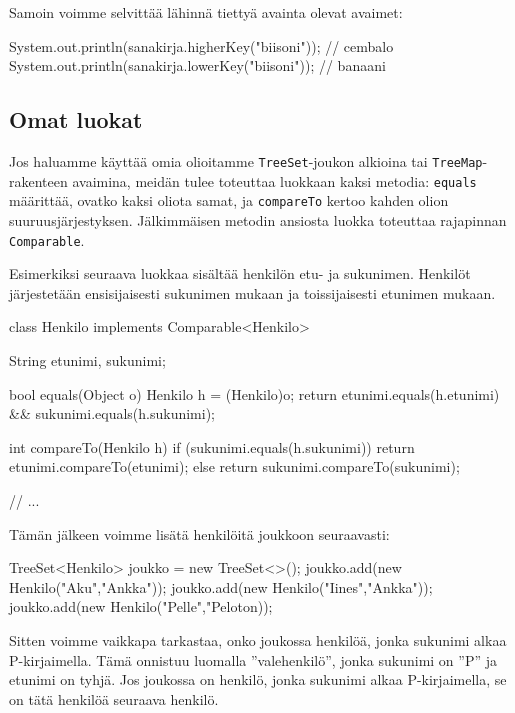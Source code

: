 Samoin voimme selvittää lähinnä tiettyä avainta olevat avaimet:

\begin{code}
System.out.println(sanakirja.higherKey("biisoni")); // cembalo
System.out.println(sanakirja.lowerKey("biisoni")); // banaani
\end{code}

\subsection{Omat luokat}

Jos haluamme käyttää omia olioitamme \texttt{TreeSet}-joukon alkioina
tai \texttt{TreeMap}-rakenteen avaimina, meidän tulee toteuttaa
luokkaan kaksi metodia:
\texttt{equals} määrittää, ovatko kaksi oliota samat,
ja \texttt{compareTo} kertoo kahden olion suuruusjärjestyksen.
Jälkimmäisen metodin ansiosta luokka toteuttaa rajapinnan
\texttt{Comparable}.

Esimerkiksi seuraava luokkaa sisältää henkilön etu- ja sukunimen.
Henkilöt järjestetään ensisijaisesti sukunimen mukaan ja
toissijaisesti etunimen mukaan.

\begin{code}
class Henkilo implements Comparable<Henkilo> {
    String etunimi, sukunimi;

    bool equals(Object o) {
        Henkilo h = (Henkilo)o;
        return etunimi.equals(h.etunimi) &&
               sukunimi.equals(h.sukunimi);
    }

    int compareTo(Henkilo h) {
        if (sukunimi.equals(h.sukunimi)) {
            return etunimi.compareTo(etunimi);
        } else {
            return sukunimi.compareTo(sukunimi);
        }
    }

    // ...
}
\end{code}

Tämän jälkeen voimme lisätä henkilöitä joukkoon seuraavasti:

\begin{code}
TreeSet<Henkilo> joukko = new TreeSet<>();
joukko.add(new Henkilo("Aku","Ankka"));
joukko.add(new Henkilo("Iines","Ankka"));
joukko.add(new Henkilo("Pelle","Peloton));
\end{code}

Sitten voimme vaikkapa tarkastaa, onko joukossa henkilöä,
jonka sukunimi alkaa P-kirjaimella.
Tämä onnistuu luomalla ''valehenkilö'', jonka sukunimi
on ''P'' ja etunimi on tyhjä.
Jos joukossa on henkilö, jonka sukunimi alkaa P-kirjaimella,
se on tätä henkilöä seuraava henkilö.

